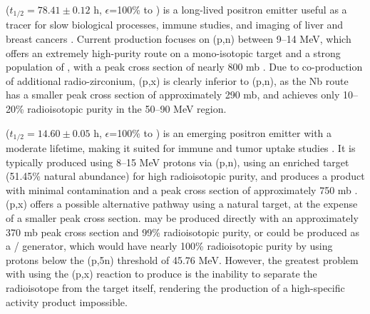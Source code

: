  ($t_{1/2}=78.41\pm0.12$ h, $\epsilon$=100\% to   \cite{Singh2013}) is a long-lived positron emitter useful as a tracer for slow biological processes, immune studies, and imaging of liver and  breast cancers \cite{Verel2003,Dijkers2009,Dijkers2010}.
Current production focuses on (p,n) between 9--14 MeV, which offers an extremely high-purity route on a mono-isotopic target and a strong population of , with a peak cross section of nearly 800 mb   \cite{PhysRevC.38.1624,Omara2009}.
Due to co-production of additional  radio-zirconium,  (p,x) is clearly inferior to  (p,n), as the Nb route has a smaller peak cross section of approximately 290 mb, and achieves only 10--20\% radioisotopic purity in the 50--90 MeV region.




 ($t_{1/2}=14.60 \pm 0.05$ h, $\epsilon$=100\% to   \cite{Browne1997}) is an emerging positron emitter with a moderate lifetime, making it suited for immune and tumor uptake studies    \cite{Busse2002,Radchenko2012}.
It is typically produced using 8--15 MeV protons via (p,n), using an enriched target (51.45\% natural abundance) for high radioisotopic purity, and produces a product with minimal contamination and a peak cross section of approximately 750 mb  \cite{Busse2002}.
(p,x) offers a possible alternative pathway using a natural target, at the expense of a smaller peak cross section.
 may be produced directly with an approximately 370 mb peak cross section and 99\% radioisotopic purity, or could be produced as a / generator, which would have nearly 100\% radioisotopic purity by using protons below the (p,5n) threshold of 45.76 MeV.
However, the greatest problem with using the (p,x) reaction to produce  is the inability to separate the radioisotope from the target itself, rendering the production of a high-specific activity product impossible.  







